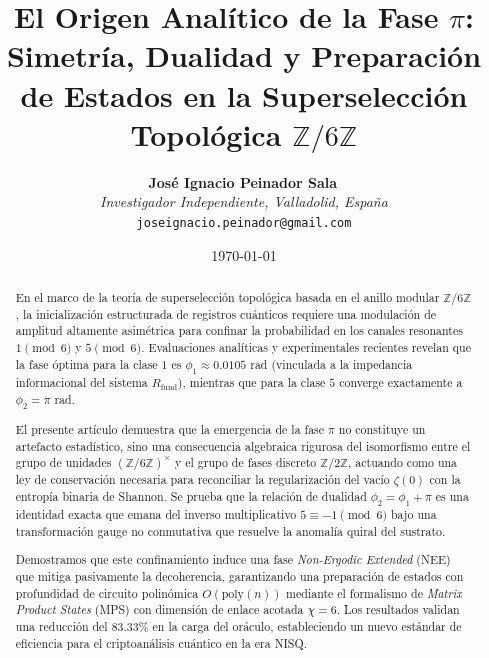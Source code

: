 \documentclass[12pt,a4paper]{article}
\theoremstyle{plain}
\theoremstyle{definition}
\theoremstyle{remark}
\begin{document}
\title{El Origen Analítico de la Fase $\pi$: Simetría, Dualidad y Preparación de Estados en la Superselección Topológica $\mathbb{Z}/6\mathbb{Z}$}

\author{
  \textbf{José Ignacio Peinador Sala}\, \\
  \textit{Investigador Independiente, Valladolid, España} \\
  \texttt{joseignacio.peinador@gmail.com}
}

\date{\today}
\maketitle

\begin{abstract}
En el marco de la teoría de superselección topológica basada en el anillo modular $\mathbb{Z}/6\mathbb{Z}$, la inicialización estructurada de registros cuánticos requiere una modulación de amplitud altamente asimétrica para confinar la probabilidad en los canales resonantes $1 \pmod 6$ y $5 \pmod 6$. Evaluaciones analíticas y experimentales recientes revelan que la fase óptima para la clase $1$ es $\phi_1 \approx 0.0105$ rad (vinculada a la impedancia informacional del sistema $R_{\text{fund}}$), mientras que para la clase $5$ converge exactamente a $\phi_2 = \pi$ rad. 

El presente artículo demuestra que la emergencia de la fase $\pi$ no constituye un artefacto estadístico, sino una consecuencia algebraica rigurosa del isomorfismo entre el grupo de unidades $(\mathbb{Z}/6\mathbb{Z})^{\times}$ y el grupo de fases discreto $\mathbb{Z}/2\mathbb{Z}$, actuando como una ley de conservación necesaria para reconciliar la regularización del vacío $\zeta(0)$ con la entropía binaria de Shannon. Se prueba que la relación de dualidad $\phi_2 = \phi_1 + \pi$ es una identidad exacta que emana del inverso multiplicativo $5 \equiv -1 \pmod{6}$ bajo una transformación gauge no conmutativa que resuelve la anomalía quiral del sustrato. 

Demostramos que este confinamiento induce una fase \textit{Non-Ergodic Extended} (NEE) que mitiga pasivamente la decoherencia, garantizando una preparación de estados con profundidad de circuito polinómica $O(\text{poly}(n))$ mediante el formalismo de \textit{Matrix Product States} (MPS) con dimensión de enlace acotada $\chi = 6$. Los resultados validan una reducción del $83.33\%$ en la carga del oráculo, estableciendo un nuevo estándar de eficiencia para el criptoanálisis cuántico en la era NISQ.
\end{abstract}
\end{document}

